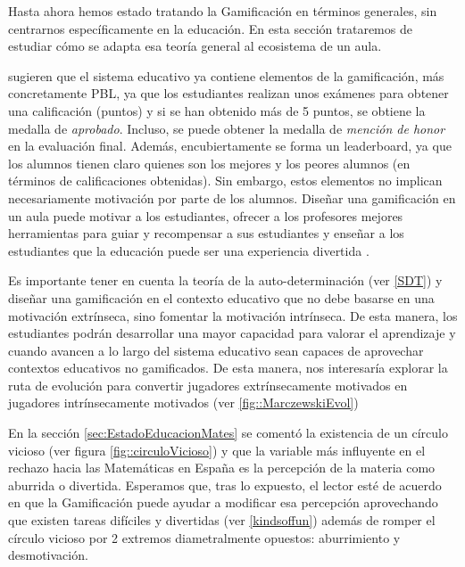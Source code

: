 Hasta ahora hemos estado tratando la Gamificación en términos generales, sin centrarnos específicamente en la educación. 
%
En esta sección trataremos de estudiar cómo se adapta esa teoría general al ecosistema de un aula.



 \cite{lee2011gamification} sugieren que el sistema educativo ya contiene elementos de la gamificación, más concretamente \gls{PBL}, ya que los estudiantes realizan unos exámenes para obtener una calificación (puntos) y si se han obtenido más de 5 puntos, se obtiene la medalla de \textit{aprobado}.
%
Incluso, se puede obtener la medalla de \textit{mención de honor} en la evaluación final.
%
Además, encubiertamente se forma un leaderboard, ya que los alumnos tienen claro quienes son los mejores y los peores alumnos (en términos de calificaciones obtenidas).
%
Sin embargo, estos elementos no implican necesariamente motivación por parte de los alumnos.
%
Diseñar una gamificación en un aula puede motivar a los estudiantes, ofrecer a los profesores mejores herramientas para guiar y recompensar a sus estudiantes y enseñar a los estudiantes que la educación puede ser una experiencia divertida  \citep{lee2011gamification}.

Es importante tener en cuenta la teoría de la auto-determinación (ver \ref{SDT}) y diseñar una gamificación en el contexto educativo que no debe basarse en una motivación extrínseca, sino fomentar la motivación intrínseca. 
%
De esta manera, los estudiantes podrán desarrollar una mayor capacidad para valorar el aprendizaje y cuando avancen a lo largo del sistema educativo sean capaces de aprovechar contextos educativos no gamificados. 
%
De esta manera, nos interesaría explorar la ruta de evolución \citep{marczewski}  para convertir jugadores extrínsecamente motivados en jugadores intrínsecamente motivados (ver \ref{fig::MarczewskiEvol})


En la sección \ref{sec:EstadoEducacionMates} se comentó la existencia de un círculo vicioso (ver figura \ref{fig::circuloVicioso}) y que la variable más influyente en el rechazo hacia las Matemáticas en España es la percepción de la materia como aburrida o divertida.
%
Esperamos que, tras lo expuesto, el lector esté de acuerdo en que la Gamificación puede ayudar a modificar esa percepción aprovechando que existen tareas difíciles y divertidas (ver \ref{kindsoffun}) además de romper el círculo vicioso por 2 extremos diametralmente opuestos: aburrimiento y desmotivación.

